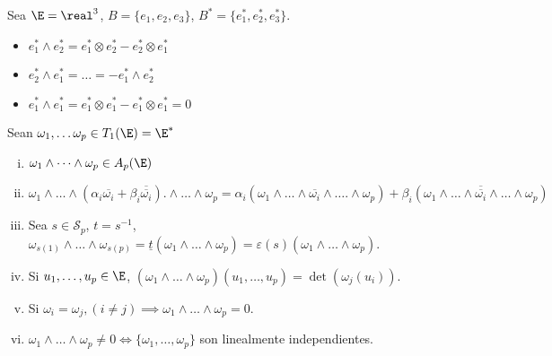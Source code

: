 \begin{example}
    Sea $ \E = \real^3 $, $ B = \{e_1, e_2, e_3\} $, $ B^* = \{ e_1^*, e_2^*,
    e_3^*\} $.
    \begin{itemize}
        \item
            $ e_1^* \wedge e_2^* = e_1^* \otimes e_2^* - e_2^* \otimes e_1^*
            $
        \item
            $ e_2^* \wedge e_1^* = \dots = -e_1^* \wedge e_2^* $
        \item
            $ e_1^* \wedge e_1^* = e_1^* \otimes e_1^* - e_1^* \otimes e_1^*
            = 0 $
    \end{itemize}
\end{example}
\begin{prop}
    \label{prop_pr_ext} Sean $ \omega_1, \dots \omega_p \in T_1(\E) = \E^*
    $
    \begin{enumerate}[i)]
    \item
        $ \omega_1 \wedge \dots \wedge \omega_p \in A_p(\E) $
    \item
        \label{prop_pr_ext_ii} $ \omega_1 \wedge \dots \wedge \left(\alpha_i
        \overline{\omega_i} + \beta_i \overline{\overline{\omega_i}}
        \right). \wedge \dots \wedge \omega_p = \alpha_i (\omega_1
        \wedge \dots \wedge \overline{\omega_i} \wedge \dots. \wedge
        \omega_p) + \beta_i (\omega_1 \wedge \dots \wedge \overline{\overline
        {\omega_i}} \wedge \dots \wedge \omega_p) $
    \item
        \label{prop_pr_ext_iii} Sea $ s \in \mathcal{S}_p $, $ t = s^{-1}
        $, $ \omega_{s(1)} \wedge \dots \wedge \omega_{s(p)} =
        \underline{t}\left(\omega_1 \wedge \dots \wedge \omega_p \right)
        = \varepsilon(s)\left( \omega_1 \wedge \dots \wedge \omega_p
        \right) $.
    \item
        \label{prop_pr_ext_iv} Si $ u_1, \dots, u_p \in \E $, $ \left(
        \omega_1 \wedge \dots \wedge \omega_p\right) \left(u_1, \dots, u_p\right)
        = \det\left(\omega_j(u_i)\right) $.
    \item
        \label{prop_pr_ext_v} Si $ \omega_i = \omega_j , (i \neq j)
        \implies \omega_1 \wedge \dots \wedge \omega_p = 0 $.
    \item
        $ \omega_1 \wedge \dots \wedge \omega_p \neq 0 \iff \{\omega_1,\dots,\omega_p\}
        $ son linealmente independientes.
\end{enumerate}
\end{prop}
